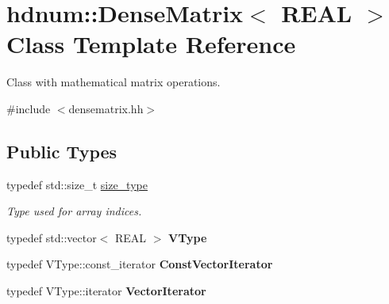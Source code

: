 \hypertarget{classhdnum_1_1DenseMatrix}{
\section{hdnum::DenseMatrix$<$ REAL $>$ Class Template Reference}
\label{classhdnum_1_1DenseMatrix}
}


Class with mathematical matrix operations.  




{\ttfamily \#include $<$densematrix.hh$>$}

\subsection*{Public Types}
\begin{DoxyCompactItemize}
\item 
\hypertarget{classhdnum_1_1DenseMatrix_ac524278e2ff8ab9e47d03376bb1d35cc}{
typedef std::size\_\-t \hyperlink{classhdnum_1_1DenseMatrix_ac524278e2ff8ab9e47d03376bb1d35cc}{size\_\-type}}
\label{classhdnum_1_1DenseMatrix_ac524278e2ff8ab9e47d03376bb1d35cc}

\begin{DoxyCompactList}\small\item\em Type used for array indices. \item\end{DoxyCompactList}\item 
\hypertarget{classhdnum_1_1DenseMatrix_a74403a826f8e6d873e0108e3dfc0b271}{
typedef std::vector$<$ REAL $>$ {\bfseries VType}}
\label{classhdnum_1_1DenseMatrix_a74403a826f8e6d873e0108e3dfc0b271}

\item 
\hypertarget{classhdnum_1_1DenseMatrix_ab680a3c46c7cba92a82eef5d4d3eb0b9}{
typedef VType::const\_\-iterator {\bfseries ConstVectorIterator}}
\label{classhdnum_1_1DenseMatrix_ab680a3c46c7cba92a82eef5d4d3eb0b9}

\item 
\hypertarget{classhdnum_1_1DenseMatrix_ac5d21573d755db58b7a53bd49b2e89d3}{
typedef VType::iterator {\bfseries VectorIterator}}
\label{classhdnum_1_1DenseMatrix_ac5d21573d755db58b7a53bd49b2e89d3}

\end{DoxyCompactItemize}
